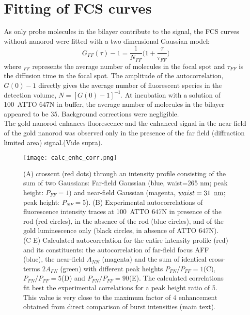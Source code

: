 \section{Fitting of FCS curves}
As only probe molecules in the bilayer contribute to the signal, the FCS curves without nanorod
were fitted with a two-dimensional Gaussian model:
\begin{equation}
	G_{FF}(\tau)-1 = \frac{1}{N_{FF}}\Bigg(1+\frac{\tau}{\tau_{FF}}\Bigg)
	\label{eq:2Dgauss}
\end{equation}
where $_{FF}$ represents the average number of molecules in the focal spot and $\tau_{FF}$ is the diffusion time in the focal spot. The amplitude of the autocorrelation, $G(0)-1$ directly gives the average number of fluorescent species in the detection volume, $N=[G(0)-1]^{-1}$. At incubation with a solution of 100~\nM ATTO 647N in buffer, the average number of molecules in the bilayer appeared to be 35. Background corrections were negligible.\\
The gold nanorod enhances fluorescence and the enhanced signal in the near-field of the gold nanorod was observed only in the presence of the far field (diffraction limited area) signal.(Vide supra).\\
\begin{figure}[ht]
  \centering
  \texttt{[image: calc\_enhc\_corr.png]}
  \makeatletter
  \renewcommand{\fnum@figure}{\figurename~S\thefigure}
  \makeatother{}
  \caption{(A) crosscut (red dots) through an intensity profile consisting of the sum of two Gaussians: Far-field Gaussian (blue, waist=265 nm; peak height: $P_{FF}=1$) and near-field Gaussian (magenta, $waist=31~\,\textrm{nm}$; peak height: $P_{NF}=5$). (B) Experimental autocorrelations of fluorescence intensity traces at 100~\nM ATTO 647N in presence of the rod (red circles), in the absence of the rod (blue circles), and of the gold luminescence only (black circles, in absence of ATTO 647N). (C-E) Calculated autocorrelation for the entire intensity profile (red) and its constituents: the autocorrelation of far-field focus AFF (blue), the near-field $A_{NN}$ (magenta) and the sum of identical cross-terms $2A_{FN}$ (green) with different peak heights $P_{FN}/P_{FF}=1$(C), $P_{FN}/P_{FF}=5$(D) and $P_{FN}/P_{FF}=90$(E). The calculated correlations fit best the experimental correlations for a peak height ratio of 5. This value is very close to the maximum factor of 4 enhancement obtained from direct comparison of burst intensities (main text).}
  \label{SIfig:calc_enhc_corr}
\end{figure}

